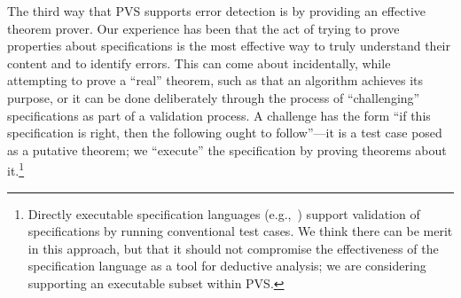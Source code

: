 The third way that PVS supports error detection is by providing an
effective theorem prover.  Our experience has been that the act of
trying to prove properties about specifications is the most effective
way to truly understand their content and to identify errors.  This
can come about incidentally, while attempting to prove a ``real''
theorem, such as that an algorithm achieves its purpose, or it can be
done deliberately through the process of ``challenging''
specifications as part of a validation process.  A challenge has the
form ``if this specification is right, then the following ought to
follow''---it is a test case posed as a putative theorem; we
``execute'' the specification by proving theorems about
it.\footnote{Directly executable specification languages
(e.g.,~\cite{me-too,Hekmatpour&Ince:prototyping}) support validation
of specifications by running conventional test cases.  We think there
can be merit in this approach, but that it should not compromise the
effectiveness of the specification language as a tool for deductive
analysis; we are considering supporting an executable subset within
PVS.}

